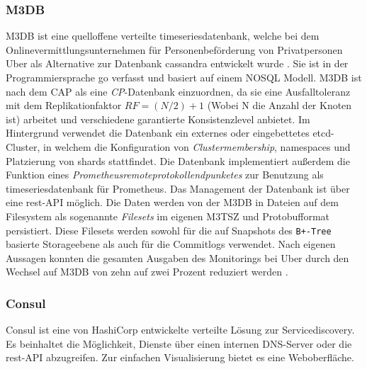 \documentclass[11pt,a4paper]{article}
\begin{document}
\subsubsection{M3DB}
\label{sssec:m3db}
M3DB ist eine quelloffene verteilte \gls{timeseries}datenbank, welche bei dem Onlinevermittlungsunternehmen für
Personenbeförderung von Privatpersonen Uber als Alternative zur Datenbank \gls{cassandra} entwickelt wurde \cite{m3db}.
Sie ist in der Programmiersprache \gls{go} verfasst und basiert auf einem \gls{NOSQL} Modell. M3DB ist nach dem \gls{CAP}
als eine \emph{CP}-Datenbank \cite{cap} einzuordnen, da sie eine Ausfalltoleranz mit dem Replikationfaktor
\begin{math}
  RF = (N / 2) + 1
\end{math} (Wobei N die Anzahl der Knoten ist) arbeitet und verschiedene garantierte Konsistenzlevel anbietet.
Im Hintergrund verwendet die Datenbank ein externes oder eingebettetes \gls{etcd}-Cluster, in welchem
die Konfiguration von \emph{Clustermembership}, \gls{namespaces} und Platzierung von \gls{shards} stattfindet.
Die Datenbank implementiert außerdem
die Funktion eines \emph{Prometheusremoteprotokollendpunketes} zur Benutzung als \gls{timeseries}datenbank für Prometheus.
Das Management der Datenbank ist über eine \gls{rest}-API möglich.
Die Daten werden von der M3DB in Dateien auf dem Filesystem als sogenannte \emph{Filesets} im eigenen M3TSZ und \gls{Protobuf}format persistiert.
Diese Filesets werden sowohl für die auf Snapshots des \verb|B+-Tree| basierte Storageebene als auch für die Commitlogs verwendet.
Nach eigenen Aussagen konnten die gesamten Ausgaben des Monitorings bei Uber durch den Wechsel auf M3DB von zehn auf zwei Prozent
reduziert werden \cite{m3db-blog}.
\subsubsection{Consul}
\label{sssec:consul}
Consul ist eine von HashiCorp entwickelte verteilte Lösung zur Servicediscovery. Es beinhaltet die Möglichkeit, Dienste
über einen internen DNS-Server oder die \gls{rest}-API abzugreifen. Zur einfachen Visualisierung bietet es eine Weboberfläche.
\end{document}
